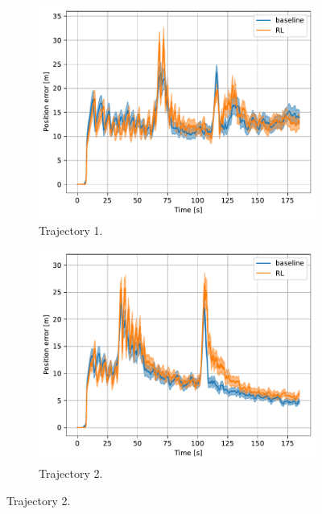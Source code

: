 \documentclass[english, 12pt, a4paper, elec, utf8, a-1b, online]{aaltothesis}
\begin{document}
\begin{figure}[htb]
    \centering
    \begin{subfigure}[b]{0.45\textwidth}
        \centering
        \includegraphics[width=\linewidth]{figures/benchmark/Simulations/mean_position_error0.pdf}
        \caption{Trajectory 1.}
        \label{fig:PE_T1}
    \end{subfigure}
    \hfill
    \begin{subfigure}[b]{0.45\textwidth}
        \centering
        \includegraphics[width=\linewidth]{figures/benchmark/Simulations/mean_position_error1.pdf}
        \caption{Trajectory 2.}
        \label{fig:PE_T2}
    \end{subfigure}

\end{figure}
\end{document}
